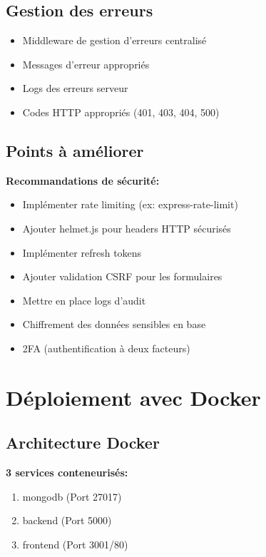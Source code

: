 \documentclass[12pt,a4paper]{article}
\begin{document}
\subsection{Gestion des erreurs}

\begin{itemize}
    \item[\checkmark] Middleware de gestion d'erreurs centralisé
    \item[\checkmark] Messages d'erreur appropriés
    \item[\checkmark] Logs des erreurs serveur
    \item[\checkmark] Codes HTTP appropriés (401, 403, 404, 500)
\end{itemize}

\subsection{Points à améliorer}

\textbf{Recommandations de sécurité:}
\begin{itemize}
    \item Implémenter rate limiting (ex: express-rate-limit)
    \item Ajouter helmet.js pour headers HTTP sécurisés
    \item Implémenter refresh tokens
    \item Ajouter validation CSRF pour les formulaires
    \item Mettre en place logs d'audit
    \item Chiffrement des données sensibles en base
    \item 2FA (authentification à deux facteurs)
\end{itemize}

\section{Déploiement avec Docker}

\subsection{Architecture Docker}

\textbf{3 services conteneurisés:}
\begin{enumerate}
    \item mongodb (Port 27017)
    \item backend (Port 5000)
    \item frontend (Port 3001/80)
\end{enumerate}
\end{document}
